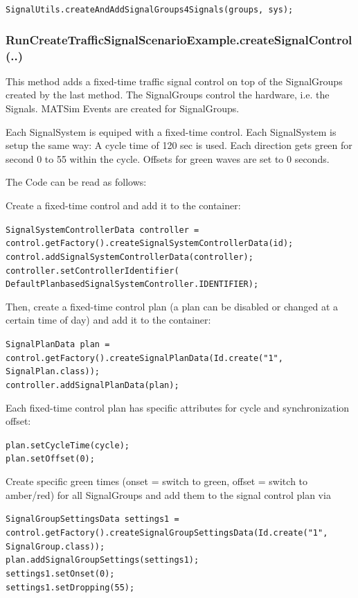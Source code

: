 \texttt{\nolinebreak SignalUtils.createAndAddSignalGroups4Signals(groups, sys);}

\subsubsection{RunCreateTrafficSignalScenarioExample.createSignalControl(..)}

This method adds a fixed-time traffic signal control on top of the SignalGroups created by the last method. The SignalGroups control the hardware, i.e. the Signals. MATSim Events are created for SignalGroups.

Each SignalSystem is equiped with a fixed-time control. Each SignalSystem is setup the same way: A cycle time of 120 sec is used. Each direction gets green for second 0 to 55 within the cycle. Offsets for green waves are set to 0 seconds.

The Code can be read as follows:

Create a fixed-time control and add it to the container:


\texttt{\nolinebreak  SignalSystemControllerData controller = control.getFactory().createSignalSystemControllerData(id); \\ \nolinebreak control.addSignalSystemControllerData(controller); \\ \nolinebreak controller.setControllerIdentifier( DefaultPlanbasedSignalSystemController.IDENTIFIER);\nolinebreak }

Then, create a fixed-time control plan (a plan can be disabled or changed at a certain time of day) and add it to the container:


\texttt{\nolinebreak    SignalPlanData plan = control.getFactory().createSignalPlanData(Id.create("1", SignalPlan.class));\\ \nolinebreak    controller.addSignalPlanData(plan);\nolinebreak  }

Each fixed-time control plan has specific attributes for cycle and synchronization offset:


\texttt{\nolinebreak    plan.setCycleTime(cycle);\\ \nolinebreak   plan.setOffset(0);\nolinebreak }

Create specific green times (onset = switch to green, offset = switch to amber/red) for all SignalGroups and add them to the signal control plan via


\texttt{\nolinebreak    SignalGroupSettingsData settings1 = control.getFactory().createSignalGroupSettingsData(Id.create("1", SignalGroup.class));\\ \nolinebreak   plan.addSignalGroupSettings(settings1);\\ \nolinebreak   settings1.setOnset(0);\\ \nolinebreak   settings1.setDropping(55);\\ \nolinebreak }

